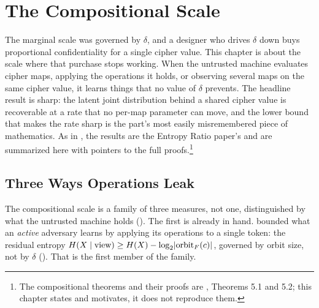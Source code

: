 
\chapter{The Compositional Scale}
\label{ch:compositional-scale}

The marginal scale was governed by $\delta$, and a designer who drives
$\delta$ down buys proportional confidentiality for a single cipher value.
This chapter is about the scale where that purchase stops working. When the
untrusted machine evaluates cipher maps, applying the operations it holds,
or observing several maps on the same cipher value, it learns things that no
value of $\delta$ prevents. The headline result is sharp: the latent joint
distribution behind a shared cipher value is recoverable at a rate that no
per-map parameter can move, and the lower bound that makes the rate sharp is
the part's most easily misremembered piece of mathematics. As in
, the results are the Entropy Ratio paper's and are
summarized here with pointers to the full proofs.\footnote{The compositional
theorems and their proofs are \cite{towell2026maxconf}, Theorems 5.1 and 5.2;
this chapter states and motivates, it does not reproduce them.}

\section{Three Ways Operations Leak}
\label{sec:compositional-measures}

The compositional scale is a family of three measures, not one, distinguished
by what the untrusted machine holds (). The first is
already in hand.  bounded what an \emph{active}
adversary learns by applying its operations to a single token: the residual
entropy $H(X \mid \text{view}) \ge H(X) - \log_2\lvert\operatorname{orbit}_F(c)\rvert$,
governed by orbit size, not by $\delta$ (). That
is the first member of the family.

